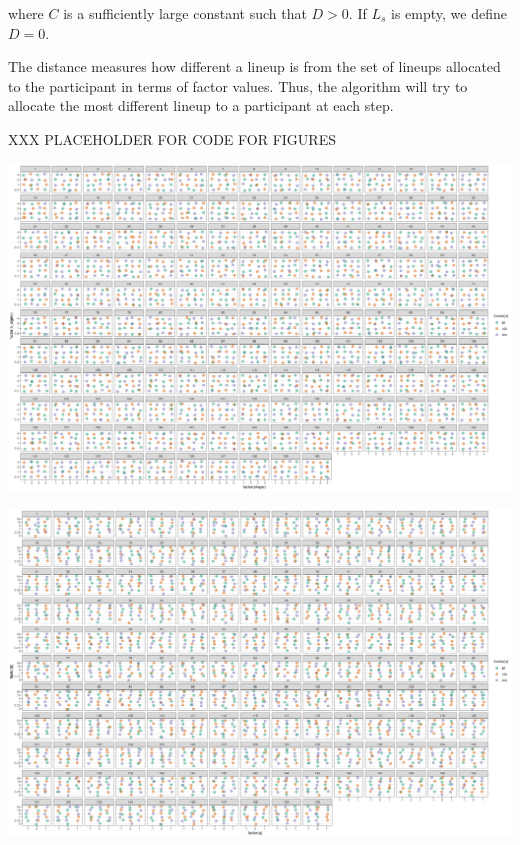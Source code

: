 \documentclass[]{interact}
\theoremstyle{plain}%
\theoremstyle{definition}
\theoremstyle{remark}
\begin{document}
\normalsize

where \(C\) is a sufficiently large constant such that \(D > 0\). If
\(L_{s}\) is empty, we define \(D = 0\).

The distance measures how different a lineup is from the set of lineups
allocated to the participant in terms of factor values. Thus, the
algorithm will try to allocate the most different lineup to a
participant at each step.

XXX PLACEHOLDER FOR CODE FOR FIGURES

\begin{center}\includegraphics[width=1\linewidth]{figures/check_allocation_for_subject_nonlin} \end{center}

\begin{center}\includegraphics[width=1\linewidth]{figures/check_allocation_for_subject_hetero} \end{center}
\end{document}
